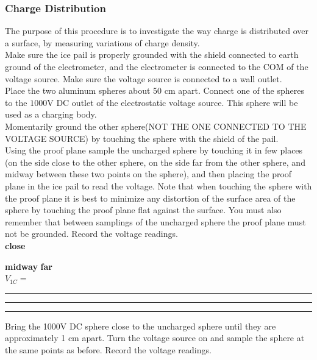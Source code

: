 {{{{\subsubsection{Charge Distribution}
\noindent The purpose of this procedure is to investigate the way
charge is distributed over a surface, by measuring variations
of charge density.\\
Make sure the ice pail is properly grounded with the shield
connected to earth ground of the electrometer, and the 
electrometer is connected to the COM  of the voltage source.
Make sure the voltage source is connected to a wall outlet.\\
\noindent Place the two aluminum spheres about 50 cm apart.
Connect one of the spheres to the $1000$V DC outlet of the
electrostatic voltage source.  This sphere will be used as a
charging body.\\
\noindent Momentarily ground the other sphere(NOT THE ONE
CONNECTED TO THE VOLTAGE SOURCE) by touching the sphere with the
shield of the pail. \\
\noindent Using the proof plane sample the uncharged sphere by
touching it in few places (on the side close to the other sphere,
on the side far from the other sphere, and midway between these two
points on the sphere), and then placing the proof plane in the ice
pail to read the voltage. Note that when touching the sphere with
the proof plane it is best to minimize any distortion of the
surface area of the sphere by touching the proof plane flat
against
the surface.  You must also remember that between samplings of the uncharged 
sphere the proof plane must not be grounded.  Record the voltage readings.\\

  \hspace{3.6cm} \textbf{close} }\hspace{2cm} \textbf{midway} \hspace{2.2cm} \textbf{far}\\

\vspace{1cm}
  \hspace{2cm}$V_{1C}=$\rule{2.5cm}{.1mm}\hspace{1cm}\rule{2.5cm}{.1mm}\hspace{1cm}\rule{2.5cm}{.1mm}

\vspace{1cm}

\noindent Bring the 1000V DC sphere close to the uncharged sphere
until they are approximately 1 cm apart.  Turn the voltage source
on and sample the sphere at the same points as before.  Record the
voltage readings.\\


}}}
